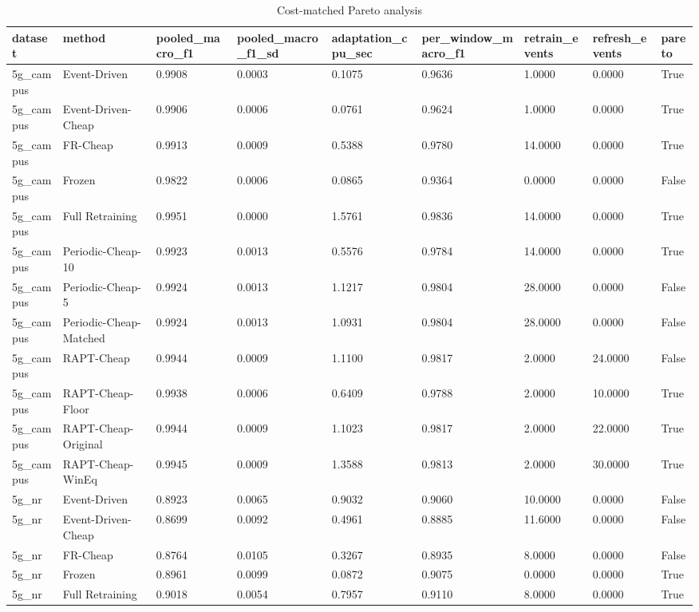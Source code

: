 \begin{table}[t]
\centering
\caption{Cost-matched Pareto analysis}
\label{tab:t4}
\begin{tabular}{lllllllll}
\toprule
dataset & method & pooled\_macro\_f1 & pooled\_macro\_f1\_sd & adaptation\_cpu\_sec & per\_window\_macro\_f1 & retrain\_events & refresh\_events & pareto \\
\midrule
5g\_campus & Event-Driven & 0.9908 & 0.0003 & 0.1075 & 0.9636 & 1.0000 & 0.0000 & True \\
5g\_campus & Event-Driven-Cheap & 0.9906 & 0.0006 & 0.0761 & 0.9624 & 1.0000 & 0.0000 & True \\
5g\_campus & FR-Cheap & 0.9913 & 0.0009 & 0.5388 & 0.9780 & 14.0000 & 0.0000 & True \\
5g\_campus & Frozen & 0.9822 & 0.0006 & 0.0865 & 0.9364 & 0.0000 & 0.0000 & False \\
5g\_campus & Full Retraining & 0.9951 & 0.0000 & 1.5761 & 0.9836 & 14.0000 & 0.0000 & True \\
5g\_campus & Periodic-Cheap-10 & 0.9923 & 0.0013 & 0.5576 & 0.9784 & 14.0000 & 0.0000 & True \\
5g\_campus & Periodic-Cheap-5 & 0.9924 & 0.0013 & 1.1217 & 0.9804 & 28.0000 & 0.0000 & False \\
5g\_campus & Periodic-Cheap-Matched & 0.9924 & 0.0013 & 1.0931 & 0.9804 & 28.0000 & 0.0000 & False \\
5g\_campus & RAPT-Cheap & 0.9944 & 0.0009 & 1.1100 & 0.9817 & 2.0000 & 24.0000 & False \\
5g\_campus & RAPT-Cheap-Floor & 0.9938 & 0.0006 & 0.6409 & 0.9788 & 2.0000 & 10.0000 & True \\
5g\_campus & RAPT-Cheap-Original & 0.9944 & 0.0009 & 1.1023 & 0.9817 & 2.0000 & 22.0000 & True \\
5g\_campus & RAPT-Cheap-WinEq & 0.9945 & 0.0009 & 1.3588 & 0.9813 & 2.0000 & 30.0000 & True \\
5g\_nr & Event-Driven & 0.8923 & 0.0065 & 0.9032 & 0.9060 & 10.0000 & 0.0000 & False \\
5g\_nr & Event-Driven-Cheap & 0.8699 & 0.0092 & 0.4961 & 0.8885 & 11.6000 & 0.0000 & False \\
5g\_nr & FR-Cheap & 0.8764 & 0.0105 & 0.3267 & 0.8935 & 8.0000 & 0.0000 & False \\
5g\_nr & Frozen & 0.8961 & 0.0099 & 0.0872 & 0.9075 & 0.0000 & 0.0000 & True \\
5g\_nr & Full Retraining & 0.9018 & 0.0054 & 0.7957 & 0.9110 & 8.0000 & 0.0000 & True \\

\end{tabular}
\end{table}
